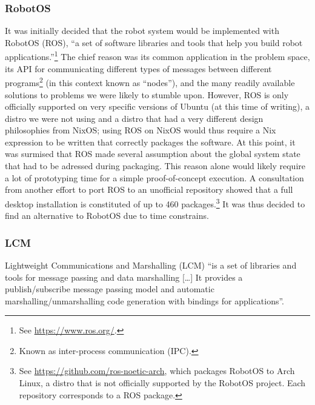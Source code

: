 \subsubsection{RobotOS}
\label{sec:ROS}
It was initially decided that the robot system would be implemented with RobotOS (ROS), ``a set of software libraries and tools that help you build robot applications.''\footnote{See \href{https://www.ros.org/}{https://www.ros.org/}.}
The chief reason was its common application in the problem space,
its API for communicating different types of messages between different programs\footnote{Known as inter-process communication (IPC).} (in this context known as ``nodes''),
and the many readily available solutions to problems we were likely to stumble upon.
However, ROS is only officially supported on very specific versions of Ubuntu (at this time of writing),
a distro we were not using and a distro that had a very different design philosophies from NixOS;
using ROS on NixOS would thus require a Nix expression to be written that correctly packages the software.
At this point, it was surmised that ROS made several assumption about the global system state that had to be adressed during packaging.
This reason alone would likely require a lot of prototyping time for a simple proof-of-concept execution.
A consultation from another effort to port ROS to an unofficial repository showed that a full desktop installation is constituted of up to 460 packages.\footnote{See \href{https://github.com/ros-noetic-arch}{https://github.com/ros-noetic-arch}, which packages RobotOS to Arch Linux, a distro that is not officially supported by the RobotOS project. Each repository corresponds to a ROS package.}
It was thus decided to find an alternative to RobotOS due to time constrains.

\subsubsection{LCM}
\label{sec:LCM}
Lightweight Communications and Marshalling (LCM) ``is a set of libraries and tools for message passing and data marshalling [\ldots] It provides a publish/subscribe message passing model and automatic marshalling/unmarshalling code generation with bindings for applications''.

